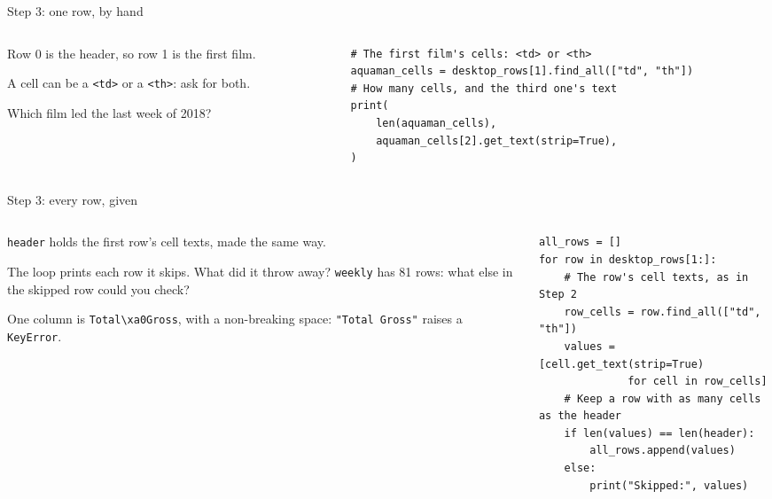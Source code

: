 \documentclass[9pt,aspectratio=169]{beamer}
\begin{document}
\begin{frame}[fragile]{Step 3: one row, by hand}
    \begin{columns}[T]
        \begin{column}{0.37\textwidth}
            Row 0 is the header, so row 1 is the first film.

            \medskip
            A cell can be a \texttt{<td>} or a \texttt{<th>}: ask for both.

            \medskip
            Which film led the last week of 2018?
        \end{column}
        \begin{column}{0.6\textwidth}
\begin{lstlisting}
# The first film's cells: <td> or <th>
aquaman_cells = desktop_rows[1].find_all(["td", "th"])
# How many cells, and the third one's text
print(
    len(aquaman_cells),
    aquaman_cells[2].get_text(strip=True),
)
\end{lstlisting}
        \end{column}
    \end{columns}
\end{frame}

\begin{frame}[fragile]{Step 3: every row, given}
    \begin{columns}[T]
        \begin{column}{0.37\textwidth}
            \texttt{header} holds the first row's cell texts, made the same way.

            \medskip
            The loop prints each row it skips. What did it throw away? \texttt{weekly} has 81 rows: what else in the skipped row could you check?

            \medskip
            One column is \texttt{Total\textbackslash xa0Gross}, with a non-breaking space: \texttt{"Total Gross"} raises a \texttt{KeyError}.
        \end{column}
        \begin{column}{0.6\textwidth}
\begin{lstlisting}
all_rows = []
for row in desktop_rows[1:]:
    # The row's cell texts, as in Step 2
    row_cells = row.find_all(["td", "th"])
    values = [cell.get_text(strip=True)
              for cell in row_cells]
    # Keep a row with as many cells as the header
    if len(values) == len(header):
        all_rows.append(values)
    else:
        print("Skipped:", values)
\end{lstlisting}
        \end{column}
    \end{columns}
\end{frame}
\end{document}
